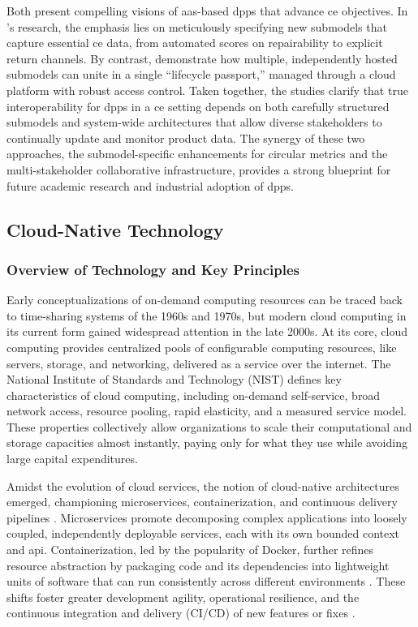 Both \textcite{Kuhn.2025, Pourjafarian.2023} present compelling visions of \ac{aas}-based \ac{dpp}s that advance \acrlong{ce} objectives. In \textcite{Kuhn.2025}'s research, the emphasis lies on meticulously specifying new submodels that capture essential \ac{ce} data, from automated scores on repairability to explicit return channels. By contrast, \textcite{Pourjafarian.2023} demonstrate how multiple, independently hosted submodels can unite in a single “lifecycle passport,” managed through a cloud platform with robust access control. Taken together, the studies clarify that true interoperability for \ac{dpp}s in a \ac{ce} setting depends on both carefully structured submodels and system-wide architectures that allow diverse stakeholders to continually update and monitor product data. The synergy of these two approaches, the submodel-specific enhancements for circular metrics and the multi-stakeholder collaborative infrastructure, provides a strong blueprint for future academic research and industrial adoption of \ac{dpp}s. \autocite{Pourjafarian.2023, Kuhn.2025}

\subsection{Cloud-Native Technology}

\subsubsection*{Overview of Technology and Key Principles}
Early conceptualizations of on-demand computing resources can be traced back to time-sharing systems of the 1960s and 1970s, but modern cloud computing in its current form gained widespread attention in the late 2000s. At its core, cloud computing provides centralized pools of configurable computing resources, like servers, storage, and networking, delivered as a service over the internet. The National Institute of Standards and Technology (NIST) defines key characteristics of cloud computing, including on-demand self-service, broad network access, resource pooling, rapid elasticity, and a measured service model. These properties collectively allow organizations to scale their computational and storage capacities almost instantly, paying only for what they use while avoiding large capital expenditures. \autocite{Armbrust.2010, Mell.2011}

Amidst the evolution of cloud services, the notion of cloud-native architectures emerged, championing microservices, containerization, and continuous delivery pipelines \autocite{Dragoni.2017, Balalaie.2016}. Microservices promote decomposing complex applications into loosely coupled, independently deployable services, each with its own bounded context and \ac{api}. Containerization, led by the popularity of Docker, further refines resource abstraction by packaging code and its dependencies into lightweight units of software that can run consistently across different environments \autocite{Merkel.2014}. These shifts foster greater development agility, operational resilience, and the continuous integration and delivery (CI/CD) of new features or fixes \autocite{Fowler.2015}.

